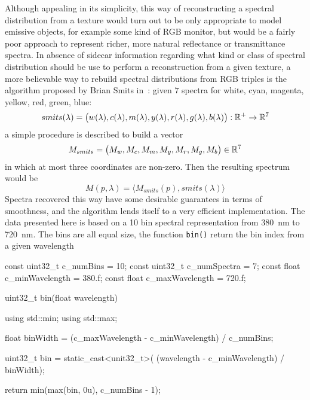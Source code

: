 Although appealing in its simplicity, this way of reconstructing a spectral
distribution from a texture would turn out to be only appropriate to model
emissive objects, for example some kind of \gls{RGB} monitor, but would be
a fairly poor approach to represent richer, more natural reflectance or
transmittance spectra.
In absence of sidecar information regarding what kind or class of spectral
distribution should be use to perform a reconstruction from a given texture,
a more believable way to rebuild spectral distributions from \gls{RGB} triples
is the algorithm proposed by Brian Smits in~\cite{smits99}: given $7$
spectra for white, cyan, magenta, yellow, red, green, blue:
\begin{displaymath}
smits(\lambda) = \big(w(\lambda), c(\lambda), m(\lambda), y(\lambda), r(\lambda), g(\lambda), b(\lambda)\big): \mathbb{R}^+\to\mathbb{R}^7
\end{displaymath}
a simple procedure is described to build a vector
\begin{displaymath}
M_{smits} = \big(M_w, M_c, M_m, M_y, M_r, M_g, M_b\big) \in \mathbb{R}^7
\end{displaymath}
in which at most three coordinates are non-zero.
Then the resulting spectrum would be
\begin{displaymath}
M(p,\lambda) = \big\langle M_{smits}(p), smits(\lambda) \big\rangle
\end{displaymath}
Spectra recovered this way have some desirable guarantees in terms of
smoothness, and the algorithm lends itself to a very efficient implementation.
The data presented here is based on a 10 bin spectral representation from
\SI{380}{\nano\meter} to \SI{720}{\nano\meter}. The bins are all equal size,
the function \Verb|bin()| return the bin index from a given wavelength


\begin{c++code}
const uint32_t c_numBins = 10;
const uint32_t c_numSpectra = 7;
const float    c_minWavelength = 380.f;
const float    c_maxWavelength = 720.f;

uint32_t bin(float wavelength)
{
    using std::min;
    using std::max;

    float binWidth = (c_maxWavelength - c_minWavelength) / c_numBins;

    uint32_t bin = static_cast<unit32_t>(
                        (wavelength - c_minWavelength) / binWidth);

    return min(max(bin, 0u), c_numBins - 1);
}
\end{c++code}


